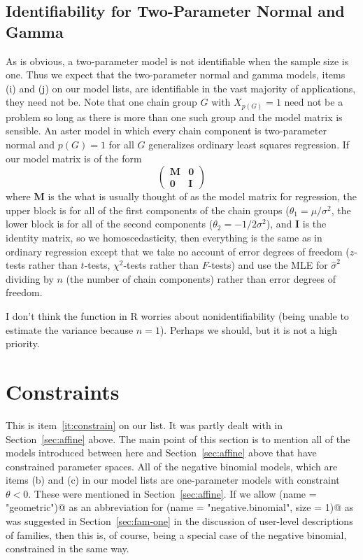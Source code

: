 \documentclass[11pt]{article}
\newcommand{\boldI}{\mathbf{I}}
\newcommand{\boldM}{\mathbf{M}}
\newcommand{\boldzero}{\boldsymbol{0}}
\begin{document}
\subsection{Identifiability for Two-Parameter Normal and Gamma}

As is obvious, a two-parameter model is not identifiable when the sample
size is one.  Thus we expect that the two-parameter normal and gamma models,
items (i) and (j) on our model lists, are identifiable in the vast majority
of applications, they need not be.
Note that one chain group $G$ with $X_{p(G)} = 1$ need not be a problem
so long as there is more than one such group and the model matrix is sensible.
An aster model in which every chain component is two-parameter normal and
$p(G) = 1$ for all $G$ generalizes ordinary least squares
regression.  If our model matrix is of the form
$$
   \begin{pmatrix} \boldM & \boldzero \\ \boldzero & \boldI \end{pmatrix}
$$
where $\boldM$ is the what is usually thought of as the model matrix for
regression, the upper block is for all of the first components of the
chain groups ($\theta_1 = \mu / \sigma^2$, the lower block is for
all of the second components ($\theta_2 = - 1 / 2 \sigma^2$), and $\boldI$
is the identity matrix, so we homoscedasticity, then everything is the
same as in ordinary regression except that we take no account of error
degrees of freedom ($z$-tests rather than $t$-tests, $\chi^2$-tests rather
than $F$-tests) and use the MLE for $\hat{\sigma}^2$ dividing by $n$ (the
number of chain components) rather than error degrees of freedom.

I don't think the \verb@lm@ function in R worries about nonidentifiability
(being unable to estimate the variance because $n = 1$).  Perhaps we should,
but it is not a high priority.

\section{Constraints} \label{sec:constrain}

This is item~\ref{it:constrain} on our list.
It was partly dealt with in Section~\ref{sec:affine} above.
The main point of this section is to mention all of the models
introduced between here and Section~\ref{sec:affine} above that
have constrained parameter spaces.  All of the negative binomial models,
which are items (b) and (c) in our model lists are one-parameter models
with constraint $\theta < 0$.  These were mentioned
in Section~\ref{sec:affine}.  If we allow
\verb@list(name = "geometric")@ as an abbreviation for
\verb@list(name = "negative.binomial", size = 1)@ as was suggested
in Section~\ref{sec:fam-one} in the discussion of user-level descriptions
of families, then this is, of course, being a special case of the negative
binomial, constrained in the same way.
\end{document}
